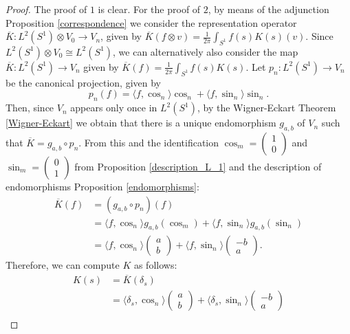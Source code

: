 \documentclass[12pt, a4paper]{article}
\theoremstyle{plain}
\theoremstyle{definition}
\theoremstyle{remark}
\begin{document}
\begin{proof}
The proof of $1$ is clear. For the proof of $2$, by means of the adjunction Proposition \ref{correspondence} we consider the representation operator $\overline{K}: L^2(S^1) \otimes V_0 \to V_n$, given by $\overline{K}(f \otimes v) = \frac{1}{2 \pi}\int_{S^1} f(s)K(s)(v)$. Since $L^2(S^1) \otimes V_0 \cong L^2(S^1)$, we can alternatively also consider the map $\overline{K}: L^2(S^1) \to V_n$ given by $\overline{K}(f) = \frac{1}{2 \pi}\int_{S^1} f(s) K(s)$. Let $p_n: L^2(S^1) \to V_n$ be the canonical projection, given by
\begin{equation*}
p_n(f) = \langle f, \cos_n \rangle \cos_n + \langle f, \sin_n \rangle \sin_n.
\end{equation*}
Then, since $V_n$ appears only once in $L^2(S^1)$, by the Wigner-Eckart Theorem \ref{Wigner-Eckart} we obtain that there is a unique endomorphism $g_{a, b}$ of $V_n$ such that $\overline{K} = g_{a, b} \circ p_n$. From this and the identification $\cos_m = \begin{pmatrix} 1 \\ 0\end{pmatrix}$ and $\sin_m = \begin{pmatrix} 0 \\ 1\end{pmatrix}$ from Proposition \ref{description_L_1} and the description of endomorphisms Proposition \ref{endomorphisms}:
\begin{align*}
\overline{K}(f) & = (g_{a, b} \circ p_n) (f) \\
& = \langle f, \cos_n \rangle g_{a, b}(\cos_m) + \langle f, \sin_n \rangle g_{a,b}(\sin_n) \\
& = \langle f, \cos_n \rangle \begin{pmatrix} a \\ b\end{pmatrix} + \langle f, \sin_n \rangle \begin{pmatrix} -b \\ a \end{pmatrix}.
\end{align*}
Therefore, we can compute $K$ as follows:
\begin{align*}
K(s) & = \overline{K}(\delta_s) \\
& = \langle \delta_s, \cos_n \rangle \begin{pmatrix} a \\ b\end{pmatrix} + \langle \delta_s, \sin_n \rangle \begin{pmatrix} -b \\ a \end{pmatrix} \\

\end{align*}
\end{proof}
\end{document}
